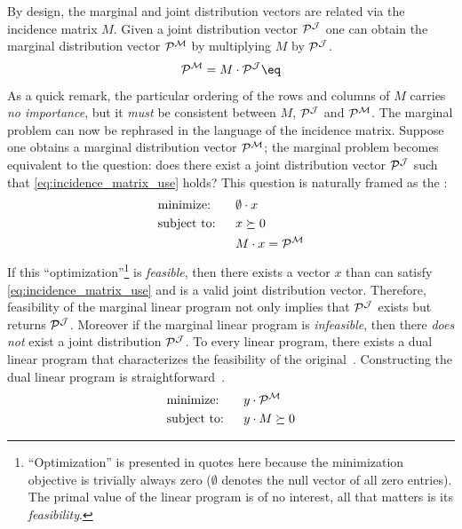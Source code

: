 \documentclass[aps, 10pt, english, twoside, pra, nofootinbib, tightenlines, longbibliography, superscriptaddress]{revtex4-1}
\begin{document}
    By design, the marginal and joint distribution vectors are related via the incidence matrix $M$. Given a joint distribution vector $\probvec^{\jointvar}$ one can obtain the marginal distribution vector $\probvec^{\mscenario}$ by multiplying $M$ by $\probvec^{\jointvar}$.
    \[ \probvec^{\mscenario} = M \cdot \probvec^{\jointvar} \eq \label{eq:incidence_matrix_use} \]
    As a quick remark, the particular ordering of the rows and columns of $M$ carries \textit{no importance}, but it \textit{must} be consistent between $M$, $\probvec^{\jointvar}$ and $\probvec^{\mscenario}$. The marginal problem can now be rephrased in the language of the incidence matrix. Suppose one obtains a marginal distribution vector $\probvec^{\mscenario}$; the marginal problem becomes equivalent to the question: does there exist a joint distribution vector $\probvec^{\jointvar}$ such that \cref{eq:incidence_matrix_use} holds? This question is naturally framed as the :
    \begin{alignat*}{2}
        & \text{minimize:} \quad&& \emptyset \cdot x\\
        & \text{subject to:} && x \succeq 0 \\
        & && M \cdot x = \probvec^{\mscenario}
    \end{alignat*}
    If this ``optimization''\footnote{``Optimization'' is presented in quotes here because the minimization objective is trivially always zero ($\emptyset$ denotes the null vector of all zero entries). The primal value of the linear program is of no interest, all that matters is its \textit{feasibility}.} is \textit{feasible}, then there exists a vector $x$ than can satisfy \cref{eq:incidence_matrix_use} and is a valid joint distribution vector. Therefore, feasibility of the marginal linear program not only implies that $\probvec^{\jointvar}$ exists but returns $\probvec^{\jointvar}$. Moreover if the marginal linear program is \textit{infeasible}, then there \textit{does not} exist a joint distribution $\probvec^{\jointvar}$. To every linear program, there exists a dual linear program that characterizes the feasibility of the original~\cite{Schrijver_1998}. Constructing the dual linear program is straightforward~\cite{Lahaie_2008}.
    \begin{alignat*}{2}
        & \text{minimize:} \quad&& y \cdot \probvec^{\mscenario}\\
        & \text{subject to:} && y \cdot M \succeq 0
    \end{alignat*}
\end{document}
